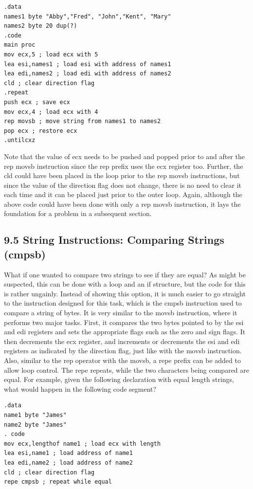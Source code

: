 \documentclass[10pt]{book}
\begin{document}
\begin{verbatim}
.data
names1 byte "Abby","Fred", "John","Kent", "Mary"
names2 byte 20 dup(?)
.code
main proc
mov ecx,5 ; load ecx with 5
lea esi,names1 ; load esi with address of names1
lea edi,names2 ; load edi with address of names2
cld ; clear direction flag
.repeat
push ecx ; save ecx
mov ecx,4 ; load ecx with 4
rep movsb ; move string from names1 to names2
pop ecx ; restore ecx
.untilcxz
\end{verbatim}

Note that the value of ecx needs to be pushed and popped prior to and after the rep movsb instruction since the rep prefix uses the ecx register too. Further, the cld could have been placed in the loop prior to the rep movsb instructions, but since the value of the direction flag does not change, there is no need to clear it each time and it can be placed just prior to the outer loop. Again, although the above code could have been done with only a rep movsb instruction, it lays the foundation for a problem in a subsequent section.

\subsection*{9.5 String Instructions: Comparing Strings (cmpsb)}
What if one wanted to compare two strings to see if they are equal? As might be suspected, this can be done with a loop and an if structure, but the code for this is rather ungainly. Instead of showing this option, it is much easier to go straight to the instruction designed for this task, which is the cmpsb instruction used to compare a string of bytes. It is very similar to the movsb instruction, where it performs two major tasks. First, it compares the two bytes pointed to by the esi and edi registers and sets the appropriate flags such as the zero and sign flags. It then decrements the ecx register, and increments or decrements the esi and edi registers as indicated by the direction flag, just like with the movsb instruction. Also, similar to the rep operator with the movsb, a repe prefix can be added to allow loop control. The repe repeats, while the two characters being compared are equal. For example, given the following declaration with equal length strings, what would happen in the following code segment?

\begin{verbatim}
.data
name1 byte "James"
name2 byte "James"
. code
mov ecx,lengthof name1 ; load ecx with length
lea esi,name1 ; load address of name1
lea edi,name2 ; load address of name2
cld ; clear direction flag
repe cmpsb ; repeat while equal
\end{verbatim}
\end{document}
